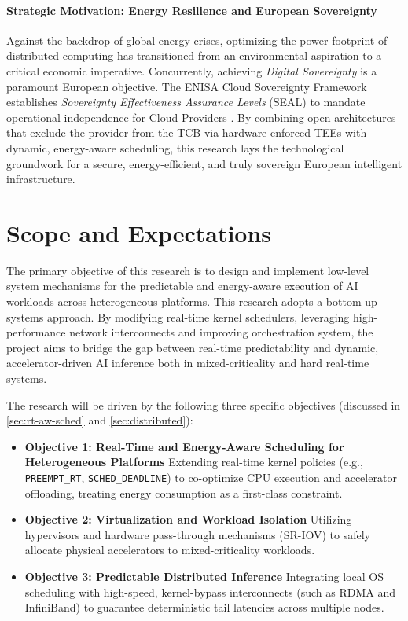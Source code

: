 \documentclass[11pt,a4paper]{article}
\begin{document}
\paragraph{Strategic Motivation: Energy Resilience and European Sovereignty}
Against the backdrop of global energy crises, optimizing the power footprint of distributed computing has transitioned from an environmental aspiration to a critical economic imperative. Concurrently, achieving \textit{Digital Sovereignty} is a paramount European objective. The ENISA Cloud Sovereignty Framework \cite{ENISA} establishes \textit{Sovereignty Effectiveness Assurance Levels} (SEAL) to mandate operational independence for Cloud Providers \cite{cloud-sovereignty-framework}. By combining open architectures that exclude the provider from the TCB via hardware-enforced TEEs with dynamic, energy-aware scheduling, this research lays the technological groundwork for a secure, energy-efficient, and truly sovereign European intelligent infrastructure.

\section{Scope and Expectations}
\label{sec:scope}

The primary objective of this research is to design and implement low-level system mechanisms for the predictable and energy-aware execution of AI workloads across heterogeneous platforms. This research adopts a bottom-up systems approach. By modifying real-time kernel schedulers, leveraging high-performance network interconnects and improving orchestration system, the project aims to bridge the gap between real-time predictability and dynamic, accelerator-driven AI inference both in mixed-criticality and hard real-time systems.

The research will be driven by the following three specific objectives (discussed in \cref{sec:rt-aw-sched} and \cref{sec:distributed}):

\begin{itemize}[leftmargin=*]
    \item \textbf{Objective 1: Real-Time and Energy-Aware Scheduling for Heterogeneous Platforms} Extending real-time kernel policies (e.g., \texttt{PREEMPT\_RT}\cite{reghenzani2019real}, \texttt{SCHED\_DEADLINE}\cite{faggioli2009edf,abeni1998integrating}) to co-optimize CPU execution and accelerator offloading, treating energy consumption as a first-class constraint.

    \item \textbf{Objective 2: Virtualization and Workload Isolation} Utilizing hypervisors and hardware pass-through mechanisms (SR-IOV) to safely allocate physical accelerators to mixed-criticality workloads.

    \item \textbf{Objective 3: Predictable Distributed Inference} Integrating local OS scheduling with high-speed, kernel-bypass interconnects (such as RDMA and InfiniBand) to guarantee deterministic tail latencies across multiple nodes.

\end{itemize}
\end{document}
